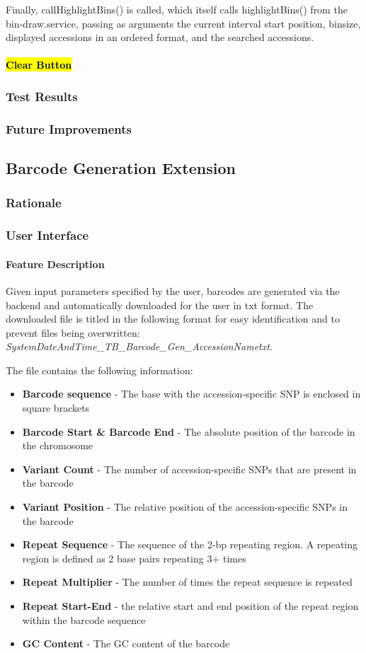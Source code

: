 \documentclass[12pt]{article}
\begin{document}
Finally, callHighlightBins() is called, which itself calls highlightBins() from the bin-draw.service, passing as arguments the current interval start position, binsize, displayed accessions in an ordered format, and the searched accessions.  
\paragraph{\hl{Clear Button }}
 

\subsubsection{Test Results}
\subsubsection{Future Improvements}
\subsection{Barcode Generation Extension}
\subsubsection{Rationale}
\subsubsection{User Interface}
\paragraph{Feature Description}
Given input parameters specified by the user, barcodes are generated via the backend and automatically downloaded for the user in txt format. The downloaded file is titled in the following format for easy identification and to prevent files being overwritten: \textit{SystemDateAndTime\_TB\_Barcode\_Gen\_AccessionName\.txt}.

The file contains the following information: 
\begin{itemize}
    \item \textbf{Barcode sequence} - The base with the accession-specific SNP is enclosed in square brackets
    \item \textbf{Barcode Start \& Barcode End} - The absolute position of the barcode in the chromosome 
    \item \textbf{Variant Count} - The number of accession-specific SNPs that are present in the barcode 
    \item \textbf{Variant Position} - The relative position of the accession-specific SNPs in the barcode 
    \item \textbf{Repeat Sequence} - The sequence of the 2-bp repeating region. A repeating region is defined as 2 base pairs repeating 3+ times 
    \item \textbf{Repeat Multiplier} - The number of times the repeat sequence is repeated 
    \item \textbf{Repeat Start-End} - the relative start and end position of the repeat region within the barcode sequence 
    \item \textbf{GC Content} - The GC content of the barcode 
\end{itemize}
\end{document}
